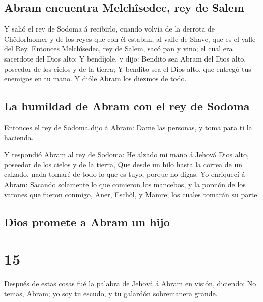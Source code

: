 \hypertarget{abram-encuentra-melchuxeesedec-rey-de-salem}{%
\subsection{Abram encuentra Melchîsedec, rey de
Salem}\label{abram-encuentra-melchuxeesedec-rey-de-salem}}

 Y salió el rey de Sodoma á recibirlo, cuando volvía de
la derrota de Chêdorlaomer y de los reyes que con él estaban, al valle
de Shave, que es el valle del Rey.  Entonces Melchîsedec,
rey de Salem, sacó pan y vino; el cual era sacerdote del Dios alto;
 Y bendíjole, y dijo: Bendito sea Abram del Dios alto,
poseedor de los cielos y de la tierra;  Y bendito sea el
Dios alto, que entregó tus enemigos en tu mano. Y dióle Abram los
diezmos de todo.

\hypertarget{la-humildad-de-abram-con-el-rey-de-sodoma}{%
\subsection{La humildad de Abram con el rey de
Sodoma}\label{la-humildad-de-abram-con-el-rey-de-sodoma}}

 Entonces el rey de Sodoma dijo á Abram: Dame las
personas, y toma para ti la hacienda.

 Y respondió Abram al rey de Sodoma: He alzado mi mano á
Jehová Dios alto, poseedor de los cielos y de la tierra, 
Que desde un hilo hasta la correa de un calzado, nada tomaré de todo lo
que es tuyo, porque no digas: Yo enriquecí á Abram: 
Sacando solamente lo que comieron los mancebos, y la porción de los
varones que fueron conmigo, Aner, Eschôl, y Mamre; los cuales tomarán su
parte.

\hypertarget{dios-promete-a-abram-un-hijo}{%
\subsection{Dios promete a Abram un
hijo}\label{dios-promete-a-abram-un-hijo}}

\hypertarget{section-14}{%
\section{15}\label{section-14}}

 Después de estas cosas fué la palabra de Jehová á Abram
en visión, diciendo: No temas, Abram; yo soy tu escudo, y tu galardón
sobremanera grande.


